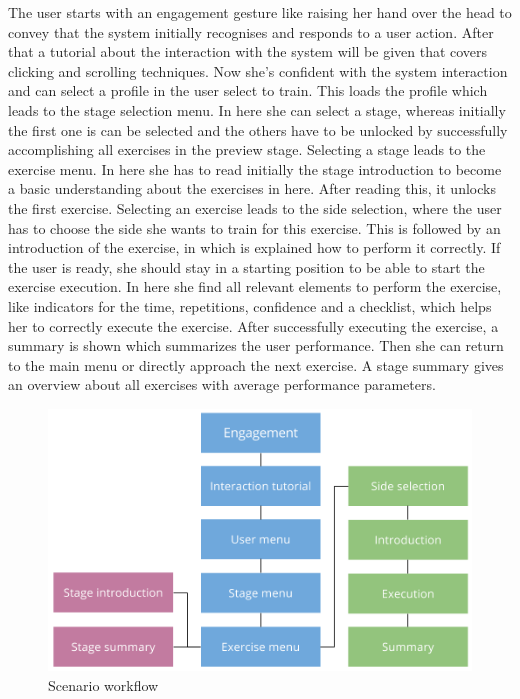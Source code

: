The user starts with an engagement gesture like raising her hand over the head to convey that the system initially recognises and responds to a user action. After that a tutorial about the interaction with the system will be given that covers clicking and scrolling techniques. Now she's confident with the system interaction and can select a profile in the user select to train. This loads the profile which leads to the stage selection menu. In here she can select a stage, whereas initially the first one is can be selected and the others have to be unlocked by successfully accomplishing all exercises in the preview stage. Selecting a stage leads to the exercise menu. In here she has to read initially the stage introduction to become a basic understanding about the exercises in here. After reading this, it unlocks the first exercise. Selecting an exercise leads to the side selection, where the user has to choose the side she wants to train for this exercise. This is followed by an introduction of the exercise, in which is explained how to perform it correctly. If the user is ready, she should stay in a starting position to be able to start the exercise execution. In here she find all relevant elements to perform the exercise, like indicators for the time, repetitions, confidence and a checklist, which helps her to correctly execute the exercise. After successfully executing the exercise, a summary is shown which summarizes the user performance. Then she can return to the main menu or directly approach the next exercise. A stage summary gives an overview about all exercises with average performance parameters.

\begin{figure}[htb]
	\centering
	\begin{minipage}[t]{1\linewidth}
		\centering
		\includegraphics[width=0.8\linewidth]{Pictures/conceptScenarioFlow2}
		\caption{Scenario workflow}
		\label{fig:scenarioWorkflow}
	\end{minipage}
\end{figure}
